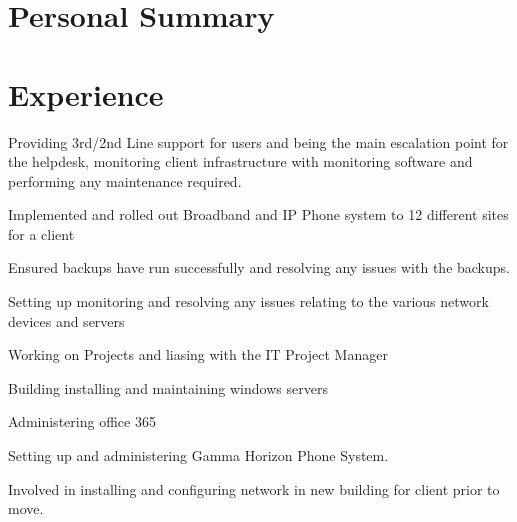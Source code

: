 \documentclass[a4paper]{deedy-resume}
\begin{document}
\begin{minipage}[t]{0.60\textwidth} %
\section{Personal Summary}

\section{Experience}

\vspace{\topsep} %
\item Providing 3rd/2nd Line support for users and being the main escalation point for the helpdesk, monitoring client infrastructure with monitoring software and performing any maintenance required.
\sectionspace
\begin{tightitemize}
\item Implemented and rolled out Broadband and IP Phone system to 12 different sites for a client 
\item Ensured backups have run successfully and resolving any issues with the backups.
\item Setting up monitoring and resolving any issues relating to the various network devices and servers 
\item Working on Projects and liasing with the IT Project Manager
\item Building installing and maintaining windows servers 
\item Administering office 365 
\item Setting up and administering Gamma Horizon Phone System.
\item Involved in installing and configuring network in new building for client prior to move.
\end{tightitemize}
\sectionspace %


\end{minipage}
\end{document}
